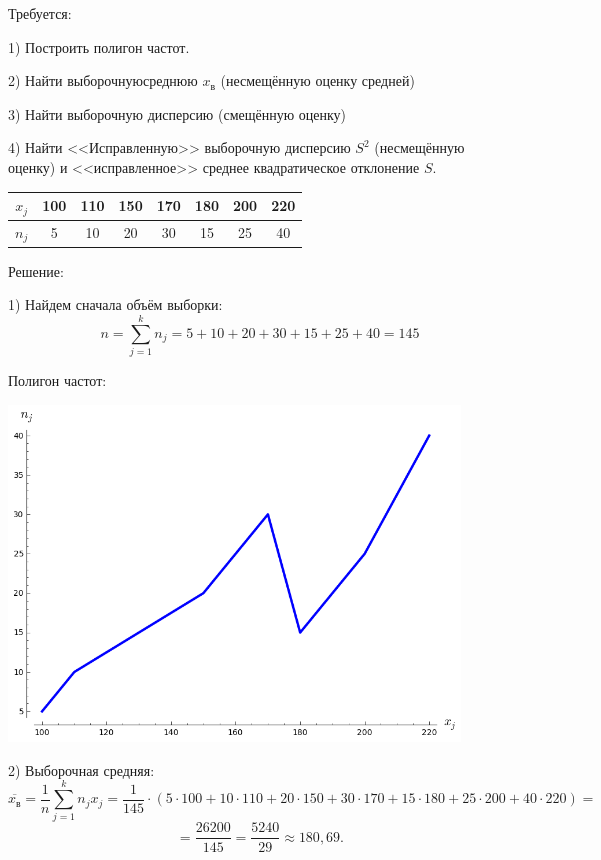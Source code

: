 \documentclass{article}
\begin{document}
\begin{enumerate}
Требуется:

1) Построить полигон частот.

2) Найти выборочнуюсреднюю $x_\textit{в}$ (несмещённую оценку средней)

3) Найти выборочную дисперсию (смещённую оценку)

4) Найти <<Исправленную>> выборочную дисперсию $S^2$ (несмещённую оценку) и <<исправленное>> среднее квадратическое отклонение $S$.

\begin{center}
\begin{tabular}{|c|c|c|c|c|c|c|c|}
\hline
$x_j$ & 100 & 110 & 150 & 170 & 180 & 200 & 220 \\
\hline
$n_j$ & 5 & 10 & 20 & 30 & 15 & 25 & 40 \\
\hline
\end{tabular}
\end{center}
\begin{center}Решение:\end{center}
1) Найдем сначала объём выборки: $$n=\sum_{j=1}^k n_j=5+10+20+30+15+25+40=145$$

Полигон частот:

\includegraphics[width=340pt,natwidth=783,natheight=583]{8_8.png}

2) Выборочная средняя:
$$\overline{x_\textit{в}}=\frac{1}{n}\sum_{j=1}^k n_j x_j=\frac{1}{145}\cdot\left(5\cdot100+10\cdot110+20\cdot150+30\cdot170+15\cdot180+25\cdot200+40\cdot220\right)=$$
$$=\frac{26200}{145}=\frac{5240}{29}\approx180,69.$$


\end{enumerate}
\end{document}
